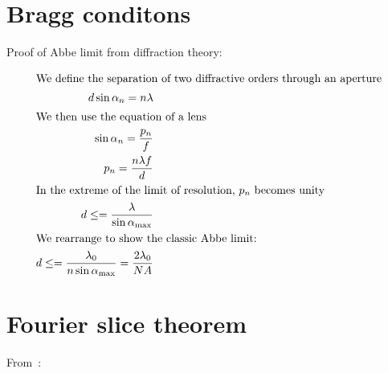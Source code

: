 \section{Bragg conditons}

Proof of Abbe limit from diffraction theory:

\begin{align}
    \intertext{We define the separation of two diffractive orders through an aperture}
    d \sin \alpha_n = n \lambda \\
    \intertext{We then use the equation of a lens}
    \sin\alpha_n = \frac{p_n}{f} \\
    p_n = \frac{n\lambda f}{d} \\
    \intertext{In the extreme of the limit of resolution, \(p_n\) becomes unity}
    d \le = \frac{\lambda}{\sin\alpha_{\text{max}}} \\
    \intertext{We rearrange to show the classic Abbe limit:}
    d \le = \frac{\lambda_0}{n\sin\alpha_{\text{max}}} = \frac{2\lambda_0}{NA}
\end{align}


\section{Fourier slice theorem}\label{appendix:fourierslice}
From~\cite{kakPrinciplesComputerizedTomographic2001}:

